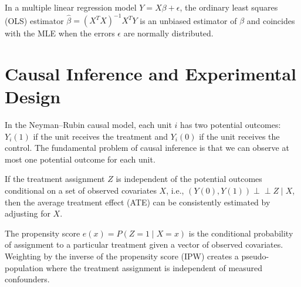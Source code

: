 \begin{example}
In a multiple linear regression model $Y = X\beta + \epsilon$, the ordinary least squares (OLS) estimator $\hat{\beta} = (X^T X)^{-1} X^T Y$ is an unbiased estimator of $\beta$ and coincides with the MLE when the errors $\epsilon$ are normally distributed.
\end{example}

\section{Causal Inference and Experimental Design}

\begin{definition}
In the Neyman--Rubin causal model, each unit $i$ has two potential outcomes: $Y_i(1)$ if the unit receives the treatment and $Y_i(0)$ if the unit receives the control. The fundamental problem of causal inference is that we can observe at most one potential outcome for each unit.
\end{definition}

\begin{theorem}[Unconfoundedness]
If the treatment assignment $Z$ is independent of the potential outcomes conditional on a set of observed covariates $X$, i.e., $(Y(0), Y(1)) \perp\!\!\!\perp Z \mid X$, then the average treatment effect (ATE) can be consistently estimated by adjusting for $X$.
\end{theorem}

\begin{example}
The propensity score $e(x) = P(Z=1 \mid X=x)$ is the conditional probability of assignment to a particular treatment given a vector of observed covariates. Weighting by the inverse of the propensity score (IPW) creates a pseudo-population where the treatment assignment is independent of measured confounders.
\end{example}
